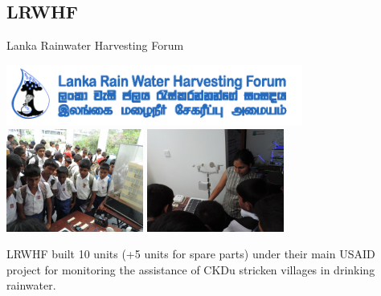 \documentclass[xcolor=dvipsnames,beamer,unknownkeysallowed]{beamer} %
\begin{document}
\subsection{LRWHF}
\begin{frame}[fragile]{Lanka Rainwater Harvesting Forum}
\begin{center}
  \includegraphics[height=2cm]{lrwhf_logo}
 \hspace{2mm}
 \includegraphics[width=4.5cm]{lrwhf1}
 \hspace{5mm}
 \includegraphics[width=4.5cm]{lrwhf3}\\
\end{center}

LRWHF built 10 units (+5 units for spare parts) under their main USAID project for monitoring the assistance of CKDu stricken villages in drinking rainwater.

\end{frame}
\end{document}
